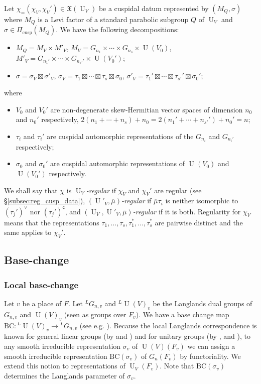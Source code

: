 \documentclass[letterpaper,11pt]{amsart}
\newcommand{\sfc}{\mathsf{c}}
\newcommand{\<}{\negthickspace}
\DeclareMathOperator{\U}{U}
\DeclareMathOperator{\cusp}{cusp}
\theoremstyle{definition}
\theoremstyle{plain}
\theoremstyle{remark}
\numberwithin{equation}{section}
\begin{document}
Let $\chi_ = (\chi_V, \chi_V') \in \mathfrak{X}(\U_V)$ be a cuspidal datum
represented by $(M_Q, \sigma)$ where $M_Q$ is a Levi factor of a standard parabolic subgroup $Q$ of $\U_V$ and $\sigma \in \Pi_{\cusp}(M_Q)$. We have the following decompositions:
\begin{itemize}
\item $M_Q= M_V \times M'_V$, $M_V = G_{n_1} \times \cdots \times G_{n_s}
    \times \U(V_0)$, $M'_V = G_{n_1'} \times \cdots \times G_{n_{s'}'}
    \times \U(V_0')$;

\item $\sigma = \sigma_V \boxtimes \sigma'_V$, $\sigma_V=\tau_1 \boxtimes
    \cdots \boxtimes \tau_s \boxtimes \sigma_0$, $\sigma'_V=\tau_1' \boxtimes
    \cdots \boxtimes \tau_{s'}' \boxtimes \sigma_0'$;
\end{itemize}
where
\begin{itemize}
\item $V_0$ and $V_0'$ are non-degenerate skew-Hermitian vector spaces of dimension
    $n_0$ and $n_0'$ respectively, $2(n_1+\cdots+n_s)+n_0=
    2(n_1'+\cdots+n_{s'}')+n_0'=n$;

\item $\tau_i$ and $\tau_i'$ are cuspidal automorphic representations of the
    $G_{n_i}$ and $G_{n_i'}$ respectively;

\item $\sigma_0$ and $\sigma_0'$ are cuspidal automorphic representations
    of $\U(V_0)$ and $\U(V_0')$ respectively.
\end{itemize}
We shall say that $\chi$ is \emph{$\U_V$-regular} if $\chi_V$ and $\chi_V'$ are regular (see \S\ref{subsec:reg_cusp_data}), \emph{$(\U'_V,\overline{\mu})$-regular} if $\overline{\mu}\tau_i$ is neither isomorphic to $(\tau_j')^\vee$ nor $(\tau_j')^{\sfc}$, and \emph{$(\U_V,\U'_V,\overline{\mu})$-regular} if it is both. Regularity for $\chi_V$ means that the representations $\tau_1, \hdots, \tau_s, \tau_1^*, \hdots,
\tau_s^*$ are pairwise distinct and the same applies to $\chi_V'$.

\subsection{Base-change}


\subsubsection{Local base-change} Let $v$ be a place of $F$. Let ${}^L G_{n,v}$ and ${}^L \U(V)_v$ be the Langlands dual groups of $G_{n,v}$ and $\U(V)_v$ (seen as groups over $F_v$). We have a base change map $\mathrm{BC} : {}^L \U(V)_v \to {}^L G_{n,v}$ (see e.g. \cites{Mok,KMSW}). Because the local Langlands correspondence is known for general linear groups (by \cite{Langlands} and \cite{HT}) and for unitary groups (by \cite{Langlands}, \cite{Mok} and \cite{KMSW}), to any smooth irreducible representation $\sigma_v$ of $\U(V)(F_v)$ we can assign a smooth irreducible representation $\mathrm{BC}(\sigma_v)$ of $G_n(F_v)$ by functoriality. We extend this notion to representations of $\U_V(F_v)$. Note that $\mathrm{BC}(\sigma_v)$ determines the Langlands parameter of $\sigma_v$. 
\end{document}
